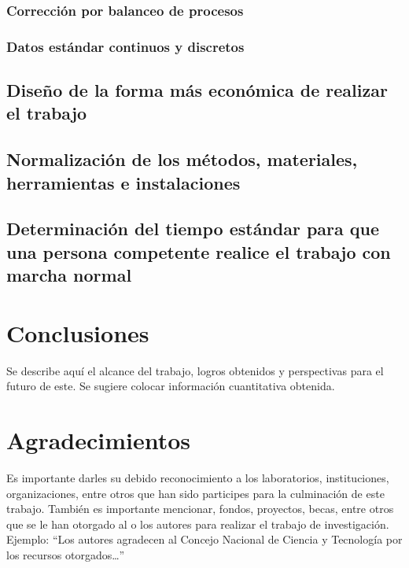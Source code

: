 \subsubsection{Corrección por balanceo de procesos}


\subsubsection{Datos estándar continuos y discretos}
%
%
\subsection{Diseño de la forma más económica de realizar el trabajo}


\subsection{Normalización de los métodos, materiales, herramientas e instalaciones}

\subsection{Determinación del tiempo estándar para que una persona competente realice el trabajo con marcha normal}


\section{Conclusiones}
    
    Se describe aquí el alcance del trabajo, logros obtenidos y perspectivas para el futuro de este. Se sugiere colocar información cuantitativa obtenida.
    
    \section{Agradecimientos}
    
    Es importante darles su debido reconocimiento a los laboratorios, instituciones, organizaciones, entre otros que han sido participes para la culminación de este trabajo. También es importante mencionar, fondos, proyectos, becas, entre otros que se le han otorgado al o los autores para realizar el trabajo de investigación. Ejemplo: “Los autores agradecen al Concejo Nacional de Ciencia y Tecnología por los recursos otorgados…”
    
    
